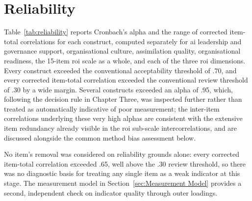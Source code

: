 \section{Reliability}
\label{sec:Reliability and Convergent Validity}
Table~\ref{tab:reliability} reports Cronbach's alpha and the range of corrected item-total correlations for each construct, computed separately for \gls{ai} leadership and governance support, organisational culture, assimilation quality, organisational readiness, the 15-item \gls{roi} scale as a whole, and each of the three \gls{roi} dimensions. Every construct exceeded the conventional acceptability threshold of .70, and every corrected item-total correlation exceeded the conventional review threshold of .30 by a wide margin. Several constructs exceeded an alpha of .95, which, following the decision rule in Chapter Three, was inspected further rather than treated as automatically indicative of poor measurement; the inter-item correlations underlying these very high alphas are consistent with the extensive item redundancy already visible in the \gls{roi} sub-scale intercorrelations, and are discussed alongside the common method bias assessment below.

\begin{table}[htbp]
	\centering
	\caption{Reliability results ($N = 354$)}
	\label{tab:reliability}
\end{table}

No item's removal was considered on reliability grounds alone: every corrected item-total correlation exceeded .65, well above the .30 review threshold, so there was no diagnostic basis for treating any single item as a weak indicator at this stage. The measurement model in Section~\ref{sec:Measurement Model} provides a second, independent check on indicator quality through outer loadings.

